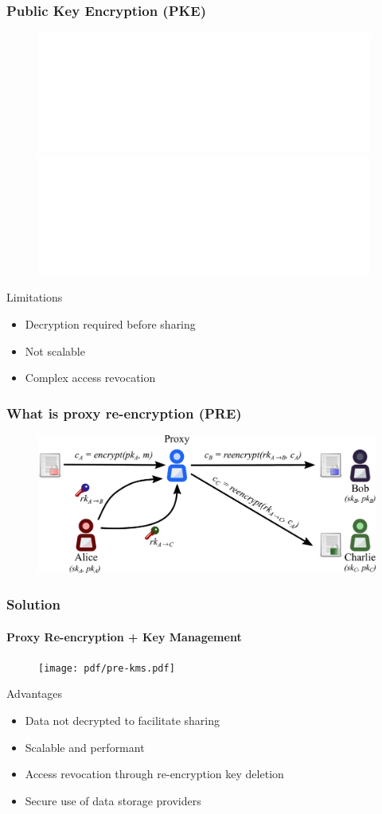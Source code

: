 \documentclass[xetex,mathsans,sans,aspectratio=169]{beamer}
\begin{document}
    \begin{frame}
        \frametitle{Public Key Encryption (PKE)}
        \begin{figure}
            \centering
            \includegraphics<1>[width=11cm]{pdf/pke-multi.pdf}
            \includegraphics<2>[width=11cm]{pdf/pke-multi-hack.pdf}
        \end{figure}

        Limitations
        \begin{itemize}
            \item Decryption required before sharing
            \item Not scalable
            \item Complex access revocation
        \end{itemize}
    \end{frame}

    \begin{frame}
        \frametitle{What is proxy re-encryption (PRE)}
        \begin{figure}
            \centering
            \includegraphics[width=13cm]{pdf/pre-multi.pdf}
        \end{figure}
    \end{frame}

    \begin{frame}
        \frametitle{Solution}
        \framesubtitle{Proxy Re-encryption + Key Management}
        \begin{figure}
            \centering
            \texttt{[image: pdf/pre-kms.pdf]}
        \end{figure}

        Advantages
        \begin{itemize}
            \item Data not decrypted to facilitate sharing
            \item Scalable and performant
            \item Access revocation through re-encryption key deletion
            \item Secure use of data storage providers
        \end{itemize}
    \end{frame}
\end{document}
